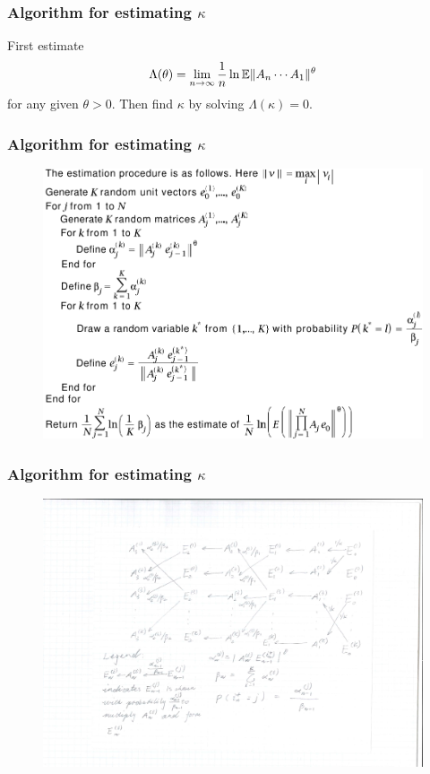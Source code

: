 \documentclass{beamer}
\begin{document}
 \begin{frame}
   \frametitle{Algorithm for estimating $\kappa$}
   First estimate
   \[
   \Lambda(\theta) = 
   \lim_{n \to \infty} {1 \over n}\ln
   \mathbb{E} \|A_n \cdots A_1\|^\theta
   \]
   for any given $\theta > 0$. Then find $\kappa$ by solving
   $\Lambda(\kappa) = 0$.
 \end{frame}

 \begin{frame}
   \frametitle{Algorithm for estimating $\kappa$}
   \begin{figure}[htb!]
     \centering
     \includegraphics[scale=0.5]{PseudoCode.pdf}
     \label{fig:PseudoCode}
   \end{figure}
 \end{frame}

 \begin{frame}
   \frametitle{Algorithm for estimating $\kappa$}
   \begin{figure}[htb!]
     \centering
     \includegraphics[scale=0.5, trim={4.5cm 0cm 4.5cm 3cm}, clip]{AnandsEstimator.pdf}
     \label{fig:PseudoCode}
   \end{figure}
 \end{frame}
\end{document}
